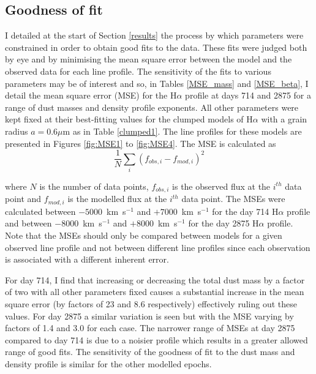 \subsection{Goodness of fit}
I detailed at the start of Section \ref{results} the process by which parameters were constrained in order to obtain good fits to the data.  These fits were judged both by eye and by minimising the mean square error between the model and the observed data for each line profile.  The sensitivity of the fits to various parameters may be of interest and so, in Tables \ref{MSE_mass} and \ref{MSE_beta}, I detail the mean square error (MSE) for the H$\alpha$ profile at days 714 and 2875 for a range of dust masses and density profile exponents.    All other parameters were kept fixed at their best-fitting values for the clumped models of H$\alpha$ with a grain radius $a=0.6\mu$m as in Table \ref{clumped1}.  The line profiles for these models are presented in Figures \ref{fig:MSE1} to \ref{fig:MSE4}.  The MSE is calculated as
\begin{equation}
\frac{1}{N} \sum_i (f_{obs,i} - f_{mod,i})^2
\end{equation}

\noindent where $N$ is the number of data points, $f_{obs,i}$ is the observed flux at the $i^{th}$ data point 
and $f_{mod,i}$ is the modelled flux at the $i^{th}$ data point. The MSEs were calculated between $-5000$~km~s$^{-1}$ and $+7000$~km~s$^{-1}$ for the day 714 H$\alpha$ profile and between $-8000$~km~s$^{-1}$ and $+8000$~km~s$^{-1}$ for the day 2875 H$\alpha$ profile.  Note that the MSEs should only be compared between models for a given observed line profile and not between different line profiles since each observation is associated with a different inherent error.

For day 714, I find that increasing or decreasing the total dust mass by a factor of two with all other parameters fixed causes a substantial increase in the mean square error (by factors of 23 and 8.6 respectively) effectively ruling out these values.  For day 2875 a similar variation is seen but with the MSE varying by factors of 1.4 and 3.0 for each case.  The narrower range of MSEs at day 2875 compared to day 714 is due to a noisier profile which results in a greater allowed range of good fits.   The sensitivity of the goodness of fit to the dust mass and density profile is similar for the other modelled epochs.


